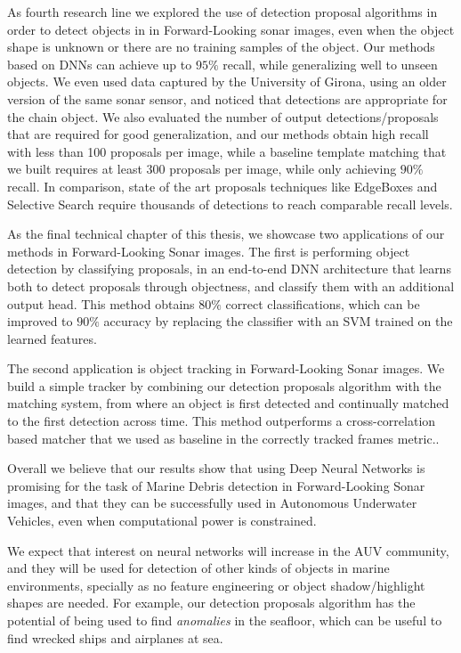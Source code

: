 As fourth research line we explored the use of detection proposal algorithms in order to detect objects in in Forward-Looking sonar images, even when the object shape is unknown or there are no training samples of the object. Our methods based on DNNs can achieve up to $95 \%$ recall, while generalizing well to unseen objects. We even used data captured by the University of Girona, using an older version of the same sonar sensor, and noticed that detections are appropriate for the chain object. We also evaluated the number of output detections/proposals that are required for good generalization, and our methods obtain high recall with less than 100 proposals per image, while a baseline template matching that we built requires at least 300 proposals per image, while only achieving $90 \%$ recall. In comparison, state of the art proposals techniques like EdgeBoxes and Selective Search require thousands of detections to reach comparable recall levels.

As the final technical chapter of this thesis, we showcase two applications of our methods in Forward-Looking Sonar images. The first is performing object detection by classifying proposals, in an end-to-end DNN architecture that learns both to detect proposals through objectness, and classify them with an additional output head. This method obtains $80 \%$ correct classifications, which can be improved to $90 \%$ accuracy by replacing the classifier with an SVM trained on the learned features.

The second application is object tracking in Forward-Looking Sonar images. We build a simple tracker by combining our detection proposals algorithm with the matching system, from where an object is first detected and continually matched to the first detection across time. This method outperforms a cross-correlation based matcher that we used as baseline in the correctly tracked frames metric..

Overall we believe that our results show that using Deep Neural Networks is promising for the task of Marine Debris detection in Forward-Looking Sonar images, and that they can be successfully used in Autonomous Underwater Vehicles, even when computational power is constrained.

We expect that interest on neural networks will increase in the AUV community, and they will be used for detection of other kinds of objects in marine environments, specially as no feature engineering or object shadow/highlight shapes are needed. For example, our detection proposals algorithm has the potential of being used to find \textit{anomalies} in the seafloor, which can be useful to find wrecked ships and airplanes at sea.

